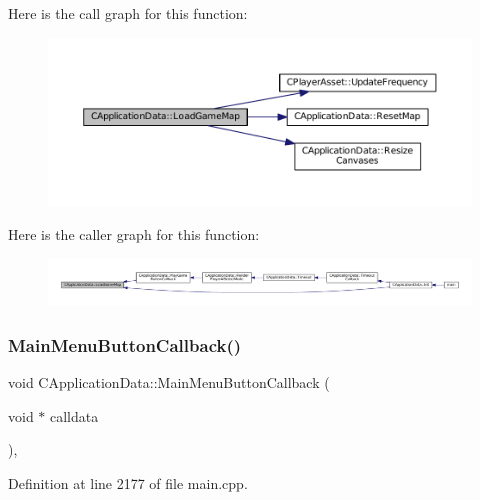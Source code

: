 Here is the call graph for this function\+:
\nopagebreak
\begin{figure}[H]
\begin{center}
\leavevmode
\includegraphics[width=350pt]{classCApplicationData_a89af0c7917be766575720e5ac79c8d2d_cgraph}
\end{center}
\end{figure}
Here is the caller graph for this function\+:
\nopagebreak
\begin{figure}[H]
\begin{center}
\leavevmode
\includegraphics[width=350pt]{classCApplicationData_a89af0c7917be766575720e5ac79c8d2d_icgraph}
\end{center}
\end{figure}
\hypertarget{classCApplicationData_a4410839118b5b74dab798ad7be6f703b}{}\label{classCApplicationData_a4410839118b5b74dab798ad7be6f703b} 
\subsubsection{\texorpdfstring{Main\+Menu\+Button\+Callback()}{MainMenuButtonCallback()}}
{\footnotesize\ttfamily void C\+Application\+Data\+::\+Main\+Menu\+Button\+Callback (\begin{DoxyParamCaption}\item[{void $\ast$}]{calldata }\end{DoxyParamCaption})\hspace{0.3cm}{\ttfamily [static]}, {\ttfamily [protected]}}



Definition at line 2177 of file main.\+cpp.


